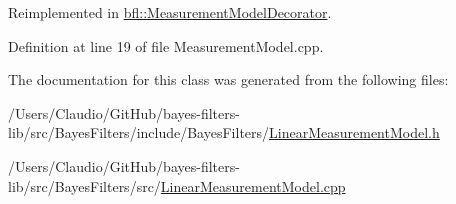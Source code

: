 Reimplemented in \mbox{\hyperlink{classbfl_1_1MeasurementModelDecorator_a531a891152d7bf83e56370664d54f42f}{bfl\+::\+Measurement\+Model\+Decorator}}.



Definition at line 19 of file Measurement\+Model.\+cpp.



The documentation for this class was generated from the following files\+:\begin{DoxyCompactItemize}
\item 
/\+Users/\+Claudio/\+Git\+Hub/bayes-\/filters-\/lib/src/\+Bayes\+Filters/include/\+Bayes\+Filters/\mbox{\hyperlink{LinearMeasurementModel_8h}{Linear\+Measurement\+Model.\+h}}\item 
/\+Users/\+Claudio/\+Git\+Hub/bayes-\/filters-\/lib/src/\+Bayes\+Filters/src/\mbox{\hyperlink{LinearMeasurementModel_8cpp}{Linear\+Measurement\+Model.\+cpp}}\end{DoxyCompactItemize}

